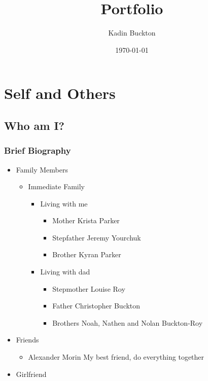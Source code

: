 \documentclass[11pt]{article}
\author{Kadin Buckton}
\date{\today}
\title{Portfolio}
\begin{document}
\maketitle
\section*{Self and Others}
\label{sec:orgc7459c6}
\subsection*{Who am I?}
\label{sec:orgcdb7af8}
\subsubsection*{Brief Biography}
\label{sec:org47cdbf3}
\begin{itemize}
\item Family Members
\label{sec:orgbac0735}
\begin{itemize}
\item Immediate Family
\label{sec:orgfcb92d8}
\begin{itemize}
\item Living with me
\label{sec:org8af0241}
\begin{itemize}
\item Mother
\label{sec:org2f80489}
Krista Parker
\item Stepfather
\label{sec:org26bf957}
Jeremy Yourchuk
\item Brother
\label{sec:org98c27e5}
Kyran Parker
\end{itemize}
\item Living with dad
\label{sec:org4e1188a}
\begin{itemize}
\item Stepmother
\label{sec:org5cfbfdb}
Louise Roy
\item Father
\label{sec:orgf5f9b24}
Christopher Buckton
\item Brothers
\label{sec:orgcfd3f2c}
Noah, Nathen and Nolan Buckton-Roy
\end{itemize}
\end{itemize}
\end{itemize}
\item Friends
\label{sec:org2cab917}
\begin{itemize}
\item Alexander Morin
\label{sec:org51de1d1}
My best friend, do everything together
\end{itemize}
\item Girlfriend
\label{sec:org2e6e87c}

\end{itemize}
\end{document}
